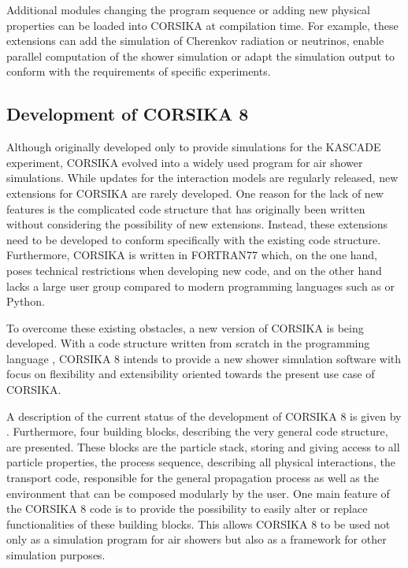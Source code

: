 Additional modules changing the program sequence or adding new physical properties can be loaded into CORSIKA at compilation time.
For example, these extensions can add the simulation of Cherenkov radiation or neutrinos, enable parallel computation of the shower simulation or adapt the simulation output to conform with the requirements of specific experiments.  

\subsection{Development of CORSIKA 8}

Although originally developed only to provide simulations for the KASCADE experiment, CORSIKA evolved into a widely used program for air shower simulations.
While updates for the interaction models are regularly released, new extensions for CORSIKA are rarely developed.
One reason for the lack of new features is the complicated code structure that has originally been written without considering the possibility of new extensions.
Instead, these extensions need to be developed to conform specifically with the existing code structure.
Furthermore, CORSIKA is written in FORTRAN77 which, on the one hand, poses technical restrictions when developing new code, and on the other hand lacks a large user group compared to modern programming languages such as \CC or Python.

To overcome these existing obstacles, a new version of CORSIKA is being developed.
With a code structure written from scratch in the programming language \CC, CORSIKA 8 intends to provide a new shower simulation software with focus on flexibility and extensibility oriented towards the present use case of CORSIKA.

A description of the current status of the development of CORSIKA 8 is given by \cite{corsika8}.
Furthermore, four building blocks, describing the very general code structure, are presented.
These blocks are the particle stack, storing and giving access to all particle properties, the process sequence, describing all physical interactions, the transport code, responsible for the general propagation process as well as the environment that can be composed modularly by the user.
One main feature of the CORSIKA 8 code is to provide the possibility to easily alter or replace functionalities of these building blocks.
This allows CORSIKA 8 to be used not only as a simulation program for air showers but also as a framework for other simulation purposes.


